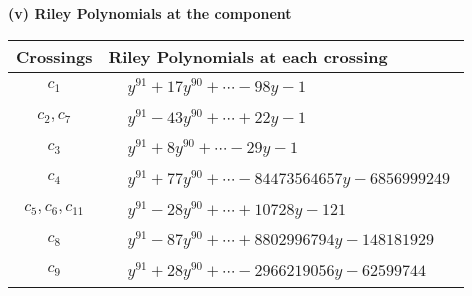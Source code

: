 \documentclass[1p]{elsarticle_modified}
\theoremstyle{definition}
\begin{document}
\newpage\renewcommand{\arraystretch}{1}
\flushleft \textbf{(v) Riley Polynomials at the component}\newline \\
\begin{tabular}{m{50pt}|m{274pt}}
Crossings & \hspace{64pt}Riley Polynomials at each crossing \\
\hline $$\begin{aligned}c_{1}\end{aligned}$$&$\begin{aligned}
&y^{91}+17 y^{90}+\cdots-98 y-1
\end{aligned}$\\
\hline $$\begin{aligned}c_{2},c_{7}\end{aligned}$$&$\begin{aligned}
&y^{91}-43 y^{90}+\cdots+22 y-1
\end{aligned}$\\
\hline $$\begin{aligned}c_{3}\end{aligned}$$&$\begin{aligned}
&y^{91}+8 y^{90}+\cdots-29 y-1
\end{aligned}$\\
\hline $$\begin{aligned}c_{4}\end{aligned}$$&$\begin{aligned}
&y^{91}+77 y^{90}+\cdots-84473564657 y-6856999249
\end{aligned}$\\
\hline $$\begin{aligned}c_{5},c_{6},c_{11}\end{aligned}$$&$\begin{aligned}
&y^{91}-28 y^{90}+\cdots+10728 y-121
\end{aligned}$\\
\hline $$\begin{aligned}c_{8}\end{aligned}$$&$\begin{aligned}
&y^{91}-87 y^{90}+\cdots+8802996794 y-148181929
\end{aligned}$\\
\hline $$\begin{aligned}c_{9}\end{aligned}$$&$\begin{aligned}
&y^{91}+28 y^{90}+\cdots-2966219056 y-62599744
\end{aligned}$\\

\end{tabular}
\end{document}
